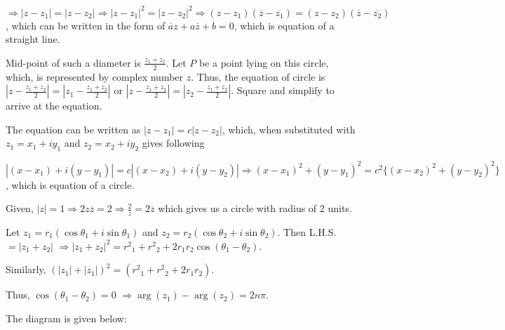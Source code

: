   $\Rightarrow |z - z_1| = |z - z_2| \Rightarrow |z - z_1|^2 = |z - z_2|^2 \Rightarrow (z -
  z_1)(\overline{z} - \overline{z_1}) = (z - z_2)(\overline{z} - \overline{z_2})$, which can be written in
  the form of $\overline{a}z + a\overline{z} + b = 0$, which is equation of a straight line.
\item Mid-point of such a diameter is $\frac{z_1 + z_2}{2}$. Let $P$ be a point lying on this circle, which,
  is represented by complex number $z$. Thus, the equation of circle is $\left|z - \frac{z_1 +
    z_2}{2}\right| = \left|z_1 - \frac{z_1 + z_2}{2}\right|$ or $\left|z - \frac{z_1 + z_2}{2}\right| =
  \left|z_2 - \frac{z_1 + z_2}{2}\right|$. Square and simplify to arrive at the equation.
\item The equation can be written as $\left|z - z_1\right| = c\left|z - z_2\right|$, which, when substituted
  with $z_1 = x_1 + iy_1$ and $z_2 = x_2 + iy_2$ gives following

  $\left|(x - x_1) + i(y - y_1)\right| = c\left|(x - x_2) + i(y - y_2)\right| \Rightarrow (x - x_1)^2 + (y -
  y_1)^2 = c^2\{(x - x_2)^2 + (y - y_2)^2\}$, which is equation of a circle.
\item Given, $|z| = 1 \Rightarrow 2z\overline{z} = 2 \Rightarrow \frac{2}{z} = 2\overline{z}$ which gives us
  a circle with radius of $2$ units.
\item  Let $z_1 = r_1(\cos\theta_1 + i\sin\theta_1)$ and $z_2 = r_2(\cos\theta_2 + i\sin\theta_2)$. Then
  L.H.S. $= \left|z_1 + z_2\right|$ $\Rightarrow \left|z_1 + z_2\right|^2 = {r^2}_1 + {r^2}_2 +
  2r_1r_2\cos(\theta_1 - \theta_2)$.

  Similarly, $\left(\left|z_1\right| + \left|z_1\right|\right)^2 = \left({r^2}_1 + {r^2}_2 + 2r_1r_2\right)$.

  Thus, $\cos(\theta_1 - \theta_2) = 0$ $\Rightarrow \arg(z_1) - \arg(z_2) = 2n\pi$.
\item The diagram is given below:
  \startplacefigure[location={left, none}]
    \startMPcode

